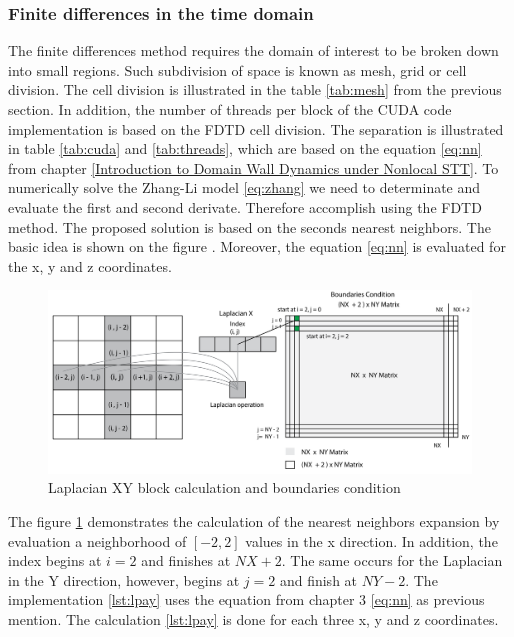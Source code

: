 \subsubsection{Finite differences in the time domain}

The finite differences method requires the domain of interest to be broken down into small regions. Such subdivision of space is known as mesh, grid or cell division. The cell division is illustrated in the table \ref{tab:mesh} from the previous section. In addition, the number of threads per block of the CUDA code implementation is based on the FDTD cell division. The separation is illustrated in table \ref{tab:cuda} and \ref{tab:threads}, which are based on the equation \ref{eq:nn} from chapter \ref{Introduction to Domain Wall Dynamics under Nonlocal STT}. To numerically solve the Zhang-Li model \ref{eq:zhang} we need to determinate and evaluate the first and second derivate. Therefore accomplish using the FDTD method. The proposed solution is based on the seconds nearest neighbors. The basic idea is shown on the figure \label{fig:laplacian}. Moreover, the equation \ref{eq:nn} is evaluated for the x, y and z coordinates.

\begin{figure}[htbp]
	\centering
		\includegraphics[width=1.0\textwidth]{Figures/laplacian.png}
		\smallskip
	\caption[Laplacian block calculation]{Laplacian XY block calculation and boundaries condition}
	\label{fig:laplacian}
\end{figure}

The figure \ref{fig:laplacian} demonstrates the calculation of the nearest neighbors expansion by evaluation a neighborhood of $[-2, 2]$ values in the x direction. In addition, the index begins at $i = 2$ and finishes at $NX + 2$. The same occurs for the Laplacian in the Y direction, however, begins at $j = 2$ and finish at $NY -2$. The implementation \ref{lst:lpay} uses the equation from chapter 3 \ref{eq:nn} as previous mention. The calculation \ref{lst:lpay} is done for each three x, y and z coordinates. 

